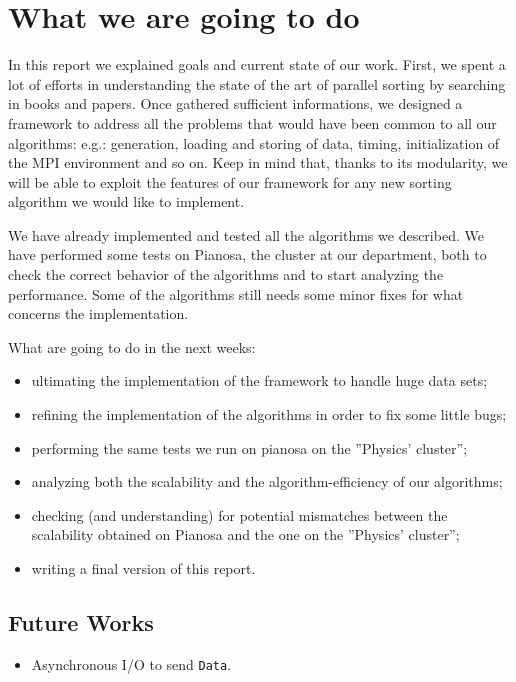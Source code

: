 \label{conclusion}
\section{What we are going to do}
In this report we explained goals and current state of our work. First, we spent a lot of efforts in understanding the state of the art of parallel sorting by searching in books and papers. Once gathered sufficient informations, we designed a framework to address all the problems that would have been common to all our algorithms: e.g.: generation, loading and storing of data, timing, initialization of the MPI environment and so on. Keep in mind that, thanks to its modularity, we will be able to exploit the features of our framework for any new sorting algorithm we would like to implement. 

We have already implemented and tested all the algorithms we described. We have performed some tests on Pianosa, the cluster at our department, both to check the correct behavior of the algorithms and to start analyzing the performance. Some of the algorithms still needs some minor fixes for what concerns the implementation.

What are going to do in the next weeks:
\begin{itemize}
\item ultimating the implementation of the framework to handle huge data sets;
\item refining the implementation of the algorithms in order to fix some little bugs;
\item performing the same tests we run on pianosa on the ''Physics' cluster'';
\item analyzing both the scalability and the algorithm-efficiency of our algorithms;
\item checking (and understanding) for potential mismatches between the scalability obtained on Pianosa and the one on the ''Physics' cluster'';
\item writing a final version of this report.
\end{itemize}

\subsection{Future Works}
\begin{itemize}
\item Asynchronous I/O to send \texttt{Data}. 
\end{itemize}